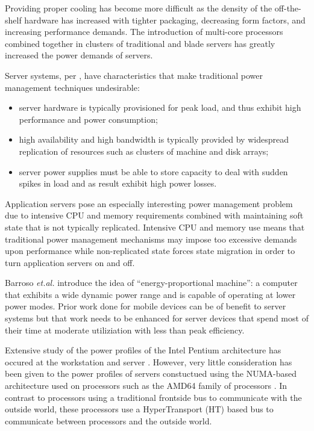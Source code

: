 \documentclass[times, 10pt,onecolumn]{article}
\begin{document}
Providing proper cooling has become more difficult as the density of the
off-the-shelf hardware has increased with tighter packaging, decreasing
form factors, and increasing performance demands.  The introduction of
multi-core processors combined together in clusters of traditional and
blade servers has greatly increased the power demands of servers.

Server systems, per \cite{Bianchini2004}, have characteristics that make
traditional power management techniques undesirable:
\begin{itemize}
\item server hardware is typically provisioned for peak load, and thus
  exhibit high performance and power consumption;
\item high availability and high bandwidth is typically provided by widespread
  replication of resources such as clusters of machine and disk arrays;
\item server power supplies must be able to store capacity to deal with sudden
  spikes in load and as result exhibit high power losses.
\end{itemize}

Application servers pose an especially interesting power management problem due
to intensive CPU and memory requirements combined with maintaining soft state
that is not typically replicated.   Intensive CPU and memory use means that
traditional power management mechanisms may impose too excessive demands upon
performance while non-replicated state forces state migration in order to turn
application servers on and off.

Barroso \textit{et.al.} \cite{Barroso2007} introduce the idea of
``energy-proportional machine'': a computer that exhibits a wide
dynamic power range and is capable of operating at lower power modes.
Prior work done for mobile devices can be of benefit to server systems
but that work needs to be enhanced for server devices that spend most of
their time at moderate utiliziation with less than peak efficiency.

Extensive study of the power profiles of the Intel Pentium architecture
has occured at the workstation \cite{Isci2003a} \cite{Isci2003b}
\cite{Isci2006} and server \cite{Bircher2004} \cite{Bircher2007}
\cite{Lee2005}.  However, very little consideration has been given to
the power profiles of servers constuctued using the {NUMA}-based
architecture used on processors such as the AMD64 family of processors
\cite{AMD2007}.  In contrast
to processors using a traditional frontside bus to communicate with the
outside world, these processors use a HyperTransport (HT) based bus
\cite{HT2007} to communicate between processors and the outside world.
\end{document}
